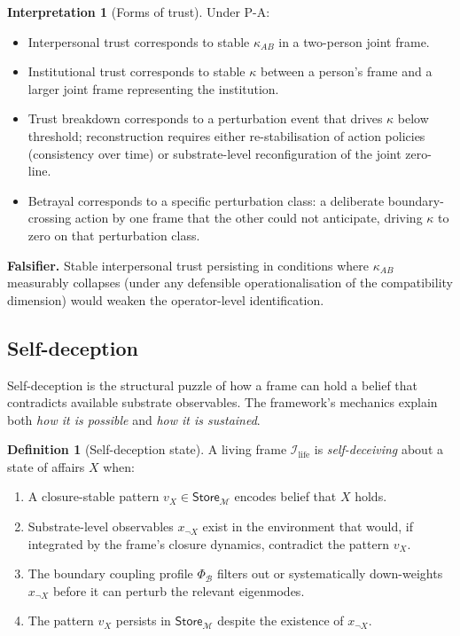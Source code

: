 \documentclass[11pt]{article}
\theoremstyle{plain}
\theoremstyle{definition}
\newtheorem{definition}[theorem]{Definition}
\newtheorem{interpretation}[theorem]{Interpretation}
\theoremstyle{remark}
\newcommand{\Ical}{\mathcal{I}}
\newcommand{\Mcal}{\mathcal{M}}
\newcommand{\Bcal}{\mathcal{B}}
\newcommand{\Ilife}{\Ical_{\mathrm{life}}}
\begin{document}
\begin{interpretation}[Forms of trust]\label{int:trust}
Under P-A:
\begin{itemize}[leftmargin=2em]
\item Interpersonal trust corresponds to stable $\kappa_{AB}$ in a two-person joint frame.
\item Institutional trust corresponds to stable $\kappa$ between a person's frame and a larger joint frame representing the institution.
\item Trust breakdown corresponds to a perturbation event that drives $\kappa$ below threshold; reconstruction requires either re-stabilisation of action policies (consistency over time) or substrate-level reconfiguration of the joint zero-line.
\item Betrayal corresponds to a specific perturbation class: a deliberate boundary-crossing action by one frame that the other could not anticipate, driving $\kappa$ to zero on that perturbation class.
\end{itemize}
\end{interpretation}

\textbf{Falsifier.} Stable interpersonal trust persisting in conditions where $\kappa_{AB}$ measurably collapses (under any defensible operationalisation of the compatibility dimension) would weaken the operator-level identification.

\subsection{Self-deception}\label{sec:self-deception}

Self-deception is the structural puzzle of how a frame can hold a belief that contradicts available substrate observables. The framework's mechanics explain both \emph{how it is possible} and \emph{how it is sustained}.

\begin{definition}[Self-deception state]\label{def:self-deception}
A living frame $\Ilife$ is \emph{self-deceiving} about a state of affairs $X$ when:
\begin{enumerate}[leftmargin=2em]
\item A closure-stable pattern $v_X \in \mathsf{Store}_\Mcal$ encodes belief that $X$ holds.
\item Substrate-level observables $x_{\neg X}$ exist in the environment that would, if integrated by the frame's closure dynamics, contradict the pattern $v_X$.
\item The boundary coupling profile $\Phi_\Bcal$ filters out or systematically down-weights $x_{\neg X}$ before it can perturb the relevant eigenmodes.
\item The pattern $v_X$ persists in $\mathsf{Store}_\Mcal$ despite the existence of $x_{\neg X}$.
\end{enumerate}
\end{definition}
\end{document}
